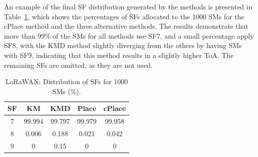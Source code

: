 \documentclass[a4paper,fleqn]{cas-dc}
\begin{document}
An example of the final \gls{SF} distribution generated by the methods is presented in Table~\ref{tab:sf_dist}, which shows the percentages of SFs allocated to the 1000 \gls{SMs} for the cPlace method and the three alternative methods. The results demonstrate that more than 99\% of the \gls{SMs} for all methods use SF7, and a small percentage apply SF8, with the KMD method slightly diverging from the others by having \gls{SMs} with SF9, indicating that this method results in a slightly higher \gls{ToA}. The remaining SFs are omitted, as they are not used.

\begin{table}[ht]
    \centering
    \caption{LoRaWAN: Distribution of SFs for 1000 \gls{SMs} (\%).}
    \begin{tabular}{ccccc}
        \hline \hline
        \gls{SF} &  KM & KMD & Place & cPlace \\ \hline
           7      &  99.994 & 99.797 & 99.979 & 99.958 \\
           8      &  0.006 &  0.188 & 0.021 & 0.042 \\
           9      &  0  &  0.15 & 0 & 0 \\ \hline \hline
    \end{tabular}
    \label{tab:sf_dist}
\end{table}
\end{document}
